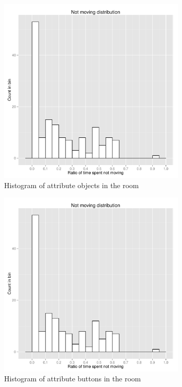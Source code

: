 \begin{figure}[!htbp]
  \centering
	\includegraphics[page=3,width=0.8\textwidth]{Images/chains_features_ML}
	\caption{Histogram of attribute objects in the room}
	\label{fig:chains-distrib-objects}
\end{figure}

\begin{figure}[!htbp]
  \centering
	\includegraphics[page=4,width=0.8\textwidth]{Images/chains_features_ML}
	\caption{Histogram of attribute buttons in the room}
	\label{fig:chains-distrib-buttons}
\end{figure}

